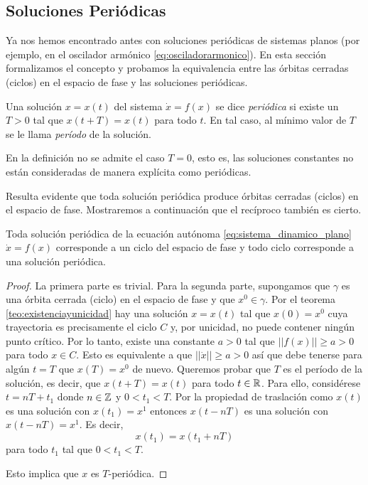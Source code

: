 \subsection{Soluciones Periódicas}

Ya nos hemos encontrado antes con soluciones periódicas de sistemas planos (por ejemplo, en el oscilador armónico \ref{eq:osciladorarmonico}). En esta sección formalizamos el concepto y probamos la equivalencia entre las órbitas cerradas (ciclos) en el espacio de fase y las soluciones periódicas.

\begin{definition} Una solución $x = x(t)$ del sistema $\dot{x} = f(x)$ se dice \emph{periódica} si existe un $T > 0$ tal que $x(t+T) = x(t)$ para todo $t$. En tal caso, al mínimo valor de $T$ se le llama \textit{período} de la solución.
\end{definition}

En la definición no se admite el caso $T=0$, esto es, las soluciones constantes no están consideradas de manera explícita como periódicas.

Resulta evidente que toda solución periódica produce órbitas cerradas (ciclos) en el espacio de fase. Mostraremos a continuación que el recíproco también es cierto.

\begin{lemma}
Toda solución periódica de la ecuación autónoma \ref{eq:sistema_dinamico_plano} $\dot{x} = f(x)$ corresponde a un ciclo del espacio de fase y todo ciclo corresponde a una solución periódica.
\end{lemma}
\begin{proof}
La primera parte es trivial. Para la segunda parte, supongamos que $\gamma$ es una órbita cerrada (ciclo) en el espacio de fase y que $x^0 \in \gamma$.
Por el teorema \ref{teo:existenciayunicidad} hay una solución $x = x(t)$ tal que $x(0) = x^0$ cuya trayectoria es precisamente el ciclo $C$ y, por unicidad, no puede contener ningún punto crítico. Por lo tanto, existe una constante $a > 0$ tal que $|| f(x) || \geq a > 0$ para todo $x \in C$.
Esto es equivalente a que $|| \dot{x} || \geq a > 0$ así que debe tenerse para algún $t = T$ que $x(T) = x^0$ de nuevo. Queremos probar que $T$ es el período de la solución, es decir, que $x(t+T) = x(t)$ para todo $t \in {\ensuremath{\mathbb{R}}}$. Para ello, considérese $t = nT + t_1$ donde $n \in {\ensuremath{\mathbb{Z}}}$ y $0 < t_1 < T$. Por la propiedad de traslación como $x(t)$ es una solución con $x(t_1) = x^1$ entonces $x(t - nT)$ es una solución con $x(t - nT) = x^1$. Es decir, $$ x(t_1) = x(t_1 + nT)$$ para todo $t_1$ tal que $0 < t_1 < T$.

Esto implica que $x$ es $T$-periódica.
\end{proof}

